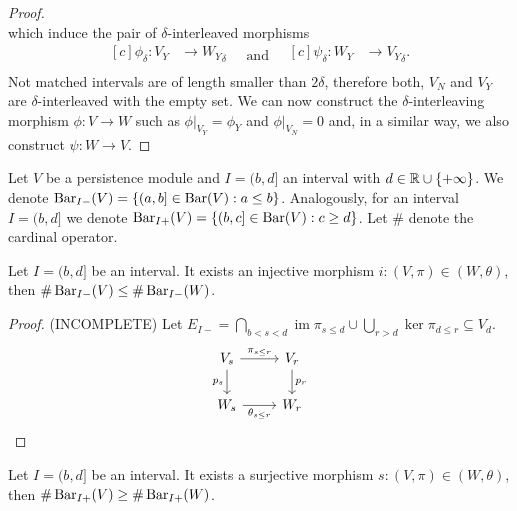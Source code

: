 \begin{proof}
\begin{equation*}
    \end{equation*}
    which induce the pair of $\delta$-interleaved morphisms
    \begin{equation*}
        \begin{aligned}[c]
        \phi_\delta: V_Y &\to {W_Y}_\delta\\
        \end{aligned}
        \quad \text{and} \quad
        \begin{aligned}[c]
        \psi_\delta: W_Y &\to {V_Y}_\delta.\\
        \end{aligned}
    \end{equation*}
    Not matched intervals are of length smaller than $ 2 \delta $, therefore both, $V_N$ and $V_Y$ are $\delta$-interleaved with the empty set. We can now construct the $\delta$-interleaving morphism $ \phi: V \to W$ such as $\phi \vert_{V_Y} = \phi_Y$ and $\phi \vert_{V_N} = 0$ and, in a similar way, we also construct $ \psi: W \to V$.
\end{proof}

Let $V$ be a persistence module and $ I = (b, d]$ an interval with $ d \in \mathbb R \cup \{+ \infty\}$. We denote $ \operatorname{Bar}_{I-}(V) = \left\{ (a, b] \in \operatorname{Bar}(V) : a \leq b\right\}$. Analogously, for an interval $ I = (b, d] $ we denote $ \operatorname{Bar}_{I+}(V) = \left\{ (b, c] \in \operatorname{Bar}(V) : c \geq d\right\}$. Let $ \# $ denote the cardinal operator.

\begin{lemma} %
    Let $ I = (b, d] $ be an interval. It exists an injective morphism $i: (V, \pi) \in (W, \theta) $, then $\# \operatorname{Bar}_{I-}(V) \leq \# \operatorname{Bar}_{I-}(W) $.
\end{lemma}
\begin{proof} (INCOMPLETE)
    Let $ E_{I-} = \bigcap_{b < s < d} \operatorname{im} \pi_{s\leq d} \cup \bigcup_{r> d} \ker \pi_{d \leq r} \subseteq V_d $.
    $$
    \begin{tikzcd}
        V_s \arrow[r, "\pi_{s \leq r}"] \arrow[d, "p_s"'] & V_r \arrow[d, "p_r"] \\
        W_s \arrow[r, "\theta_{s \leq r}"']               & W_r
    \end{tikzcd}
    $$
\end{proof}

\begin{lemma} %
    Let $ I = (b, d] $ be an interval. It exists a surjective morphism $s: (V, \pi) \in (W, \theta) $, then $\# \operatorname{Bar}_{I+}(V) \geq \# \operatorname{Bar}_{I+}(W) $.
\end{lemma}

